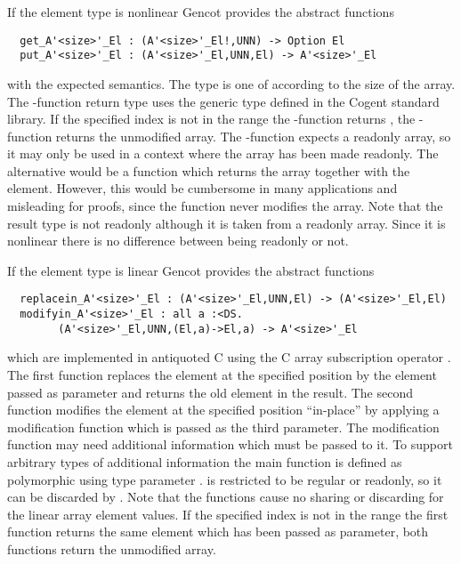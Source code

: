 If the element type is nonlinear Gencot provides the abstract functions
\begin{verbatim}
  get_A'<size>'_El : (A'<size>'_El!,UNN) -> Option El
  put_A'<size>'_El : (A'<size>'_El,UNN,El) -> A'<size>'_El
\end{verbatim}
with the expected semantics. The type  is one of  according to the size of the array.
The -function return type uses the generic type  defined in
the Cogent standard library. If the specified index is not in the range  the 
-function returns , the -function returns the unmodified array. The -function 
expects a readonly array, so it may only be used in a context where
the array has been made readonly. The alternative would be a function which returns the array together with the element.
However, this would be cumbersome in many applications and misleading for proofs, since the function never modifies
the array. Note that the result type is not readonly although it is taken from a readonly array. Since it is nonlinear
there is no difference between being readonly or not.

If the element type is linear Gencot provides the abstract functions
\begin{verbatim}
  replacein_A'<size>'_El : (A'<size>'_El,UNN,El) -> (A'<size>'_El,El)
  modifyin_A'<size>'_El : all a :<DS. 
        (A'<size>'_El,UNN,(El,a)->El,a) -> A'<size>'_El
\end{verbatim}
which are implemented in antiquoted C using the C array subscription operator \code{[]}. The first function
replaces the element at the specified position by the element passed as parameter and returns the old element in the result.
The second function modifies the element at the specified position ``in-place'' by applying a modification function
which is passed as the third parameter. The modification function
may need additional information which must be passed to it. To support arbitrary types of additional information
the main function is defined as polymorphic using type parameter .  is restricted to be regular or readonly, so it can be discarded by .
Note that the functions cause no sharing or discarding for the linear array element values. If the specified
index is not in the range  the first function returns the same element which has been
passed as parameter, both functions return the unmodified array.

